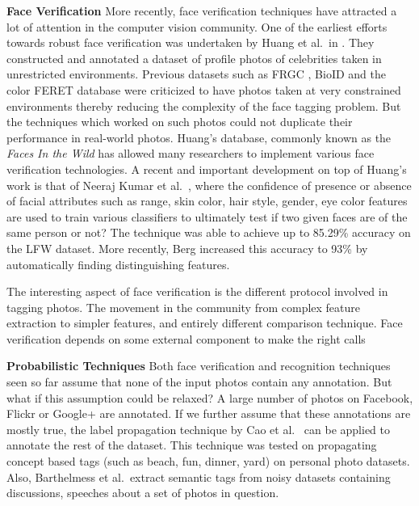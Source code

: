 \textbf{Face Verification}
More recently, face verification techniques have attracted a lot of attention in the computer vision community. One of the earliest efforts towards robust face verification was undertaken by Huang et al.\ in \cite{huang2007labeled}. They constructed and annotated a dataset of profile photos of celebrities taken in unrestricted environments. Previous datasets such as FRGC \cite{phillips2005overview}, BioID \cite{jesorsky2001robust} and the color FERET database \cite{phillips1998feret} were criticized to have photos taken at very constrained environments thereby reducing the complexity of the face tagging problem. But the techniques which worked on such photos could not duplicate their performance in real-world photos. Huang's database, commonly known as the \textit{Faces In the Wild} has allowed many researchers to implement various face verification technologies. A recent and important development on top of Huang's work is that of Neeraj Kumar et al.\ \cite{nk_attribute_classifiers}, where the confidence of presence or absence of facial attributes such as range, skin color, hair style, gender, eye color features are used to train various classifiers to ultimately test if two given faces are of the same person or not? The technique was able to achieve up to 85.29\% accuracy on the LFW dataset. More recently, Berg \cite{berg2012tom} increased this accuracy to 93\% by automatically finding distinguishing features.

The interesting aspect of face verification is the different protocol involved in tagging photos. The movement in the community from complex feature extraction to simpler features, and entirely different comparison technique. Face verification depends on some external component to make the right calls 

\textbf{Probabilistic Techniques}
Both face verification and recognition techniques seen so far assume that none of the input photos contain any annotation. But what if this assumption could be relaxed? A large number of photos on Facebook, Flickr or Google+ are annotated. If we further assume that these annotations are mostly true, the label propagation technique by Cao et al.\ \cite{cao2008annotating} can be applied to annotate the rest of the dataset. This technique was tested on propagating concept based tags (such as beach, fun, dinner, yard) on personal photo datasets. Also, Barthelmess et al.\ extract semantic tags from noisy datasets containing discussions, speeches about a set of photos in question\cite{barthelmess2007toward}. 

